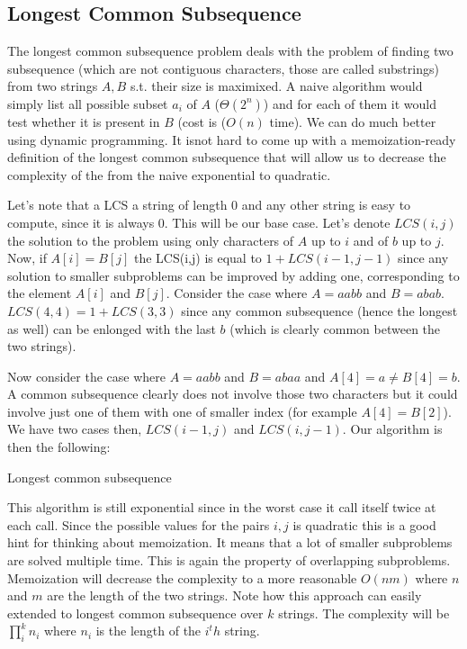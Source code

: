 \subsection{Longest Common Subsequence}
The longest common subsequence problem deals with the problem of finding two subsequence (which are not contiguous characters, those are called substrings) from two strings $A,B$ s.t. their size is maximixed. 
A naive algorithm would simply list all possible subset $a_i$ of $A$ ($\Theta(2^n)$) and for each of them it would test whether it is present in $B$ (cost is ($O(n)$ time).
We can do much better using dynamic programming. It isnot hard to come up with a memoization-ready definition of the longest common subsequence that will allow us to decrease the complexity of the from the naive exponential to quadratic.


Let's note that a LCS a string of length $0$ and any other string is easy to compute, since it is always $0$. This will be our base case.
Let's denote $LCS(i,j)$ the solution to the problem using only characters of $A$ up to $i$ and of $b$ up to $j$. 
Now, if $A[i] = B[j] $ the LCS(i,j) is equal to $1+LCS(i-1,j-1)$ since any solution to smaller subproblems can be improved by adding one, corresponding to the element $A[i]$ and $B[j]$.
Consider the case where $A=aabb$ and $B=abab$. $LCS(4,4) = 1+LCS(3,3)$ since any common subsequence (hence the longest as well) can be enlonged with the last $b$ (which is clearly common between the two strings).

Now consider the case where $A=aabb$ and $B=abaa$ and $A[4]=a \neq  B[4]=b$. A common subsequence clearly does not involve those two characters but it could involve just one of them with one of smaller index (for example $A[4] = B[2]$). We have two cases then, $LCS(i-1,j)$ and $LCS(i,j-1)$.
Our algorithm is then the following:
 \begin{algorithm}\label{alg:dagshortest}
\caption{Longest common subsequence}
\end{algorithm}
This algorithm is still exponential since in the worst case it call itself twice at each call. Since the possible values for the pairs $i,j$ is quadratic this is a good hint for thinking about memoization. It means that a lot of smaller subproblems are solved multiple time. This is again the property of overlapping subproblems. Memoization will decrease the complexity to a more reasonable $O(nm)$ where $n$ and $m$ are the length of the two strings. Note how this approach can easily extended to longest common subsequence over $k$ strings. The complexity will be $\prod_i^k n_i$ where $n_i$ is the length of the $i^th$ string.

